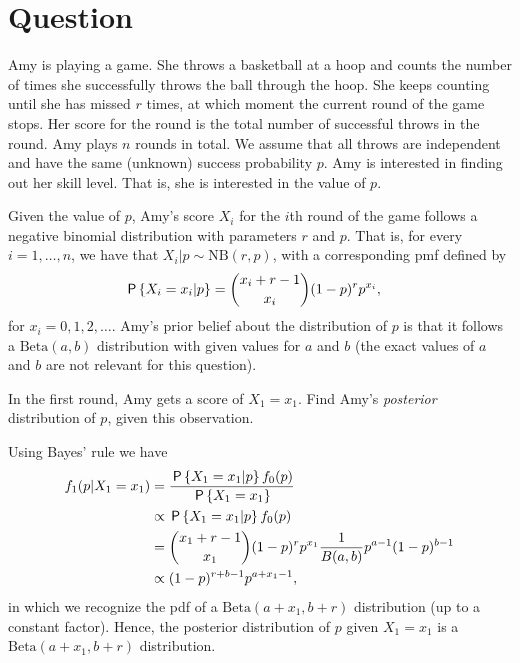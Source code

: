 \section*{Question}

Amy is playing a game. She throws a basketball at a hoop and counts the number of times she successfully throws the ball through the hoop. She keeps counting until she has missed $r$ times, at which moment the current round of the game stops. Her score for the round is the total number of successful throws in the round. Amy plays $n$ rounds in total. We assume that all throws are independent and have the same (unknown) success probability $p$. Amy is interested in finding out her skill level. That is, she is interested in the value of $p$.

Given the value of $p$, Amy's score $X_i$ for the $i$th round of the game follows a negative binomial distribution with parameters $r$ and $p$. That is, for every $i=1,\ldots,n$, we have that $X_i|p \sim \text{NB}(r,p)$, with a corresponding pmf defined by
\begin{align}
    \P{X_i = x_i | p} &= {x_i + r - 1 \choose x_i} (1 - p)^r p^{x_i},
\end{align}
for $x_i = 0,1,2,\ldots$. Amy's prior belief about the distribution of $p$ is that it follows a $\text{Beta}(a,b)$ distribution with given values for $a$ and $b$ (the exact values of $a$ and $b$ are not relevant for this question).

\begin{exercise}[2.5]
In the first round, Amy gets a score of $X_1 = x_1$. Find Amy's \textit{posterior} distribution of $p$, given this observation.
\begin{solution}
Using Bayes' rule we have
\begin{align}
    f_1(p|X_1 = x_1) &= \frac{\P{X_1 = x_1 | p} f_0(p)}{\P{X_1 = x_1}} \\
    &\propto \P{X_1 = x_1 | p} f_0(p) \\
    &= {x_1 + r - 1 \choose x_1} (1 - p)^r p^{x_1} \frac{1}{B(a,b)} p^{a-1} (1-p)^{b-1} \\
    &\propto (1 - p)^{r+b-1} p^{a+x_1-1},
\end{align}
in which we recognize the pdf of a $\text{Beta}(a+x_1, b + r)$ distribution (up to a constant factor). Hence, the posterior distribution of $p$ given $X_1 = x_1$ is a $\text{Beta}(a+x_1, b + r)$ distribution.
\end{solution}
\end{exercise}

